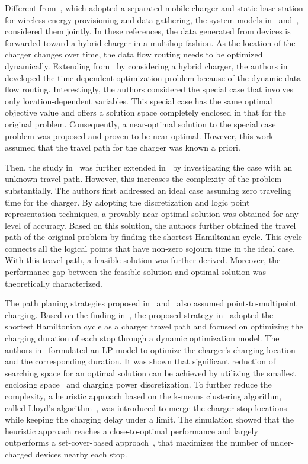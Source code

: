 \documentclass[twocolumn,10pt]{IEEEtran}
\begin{document}
Different from~\cite{L2012Xie,L.2014Shi,L2014Xie}, which adopted a separated mobile charger and static base station for wireless energy provisioning and data gathering, the system models in~\cite{LXie2013} and~\cite{L2013Xie},
considered them jointly. In these references, the data generated from devices is forwarded toward a hybrid charger in a multihop fashion. As the location of the charger changes over time, the data flow routing needs to be optimized dynamically.
Extending from~\cite{L2014Xie} by considering a hybrid charger, the authors in~\cite{LXie2013} developed the time-dependent optimization problem because of the dynamic data flow routing. Interestingly, the authors considered the special case that involves only location-dependent variables. This special case has the same optimal objective value and offers a solution space completely enclosed in that for the original problem. Consequently, a near-optimal solution to the special case problem was proposed and proven to be near-optimal. However, this work assumed that the travel path for the charger was known a priori. 

Then, the study in~\cite{LXie2013} was further extended in~\cite{L2013Xie} by investigating the case with an unknown travel path. However, this increases the complexity of the problem substantially. The authors first addressed an ideal case assuming zero traveling time for the charger. By adopting the discretization and logic point representation techniques, a provably near-optimal solution was obtained for any level of accuracy. Based on this solution, the authors further obtained the travel path of the original problem by finding the shortest Hamiltonian cycle. This cycle connects all the logical points that have non-zero sojourn time in the ideal case. With this travel path, a feasible solution was further derived. Moreover, the performance gap between the feasible solution and optimal solution was theoretically characterized.  

The path planing strategies proposed in~\cite{Z2013Qin} and~\cite{L2013Fu} also assumed point-to-multipoint charging. Based on the finding in~\cite{L2014Xie}, the proposed strategy in~\cite{Z2013Qin} adopted the shortest Hamiltonian cycle as a charger travel path and focused on optimizing the charging duration of each stop through a dynamic optimization model. The authors in~\cite{L2013Fu} formulated an LP model to optimize the charger's charging location and the corresponding duration. It was shown that significant reduction of searching space for an optimal solution can be achieved by utilizing the smallest enclosing space~\cite{E.1991Welzl} and charging power discretization. To further reduce the complexity, a heuristic approach based on the k-means clustering algorithm, called Lloyd's algorithm~\cite{S.1982Lloyd}, was introduced to merge the charger stop locations while keeping the charging delay under a limit. The simulation showed that the heuristic approach reaches a close-to-optimal performance and largely outperforms a set-cover-based approach~\cite{N.2006Alon}, that maximizes the number of under-charged devices nearby each stop.
\end{document}
